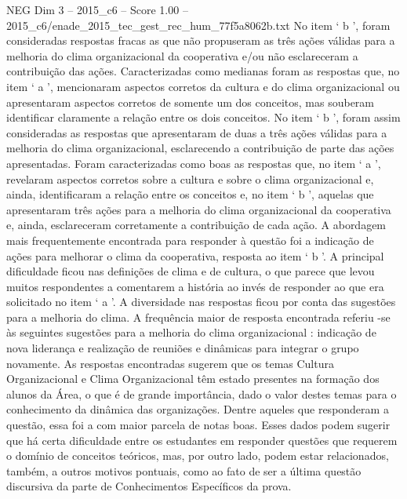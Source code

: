\begin{textsample}{NEG Dim 3 – 2015\_c6 – Score 1.00 – 2015\_c6/enade\_2015\_tec\_gest\_rec\_hum\_77f5a8062b.txt}
No item ‘ b ’, foram consideradas respostas fracas as que não propuseram as três ações válidas para a melhoria do clima organizacional da cooperativa e/ou não esclareceram a contribuição das ações.
Caracterizadas como medianas foram as respostas que, no item ‘ a ’, mencionaram aspectos corretos da cultura e do clima organizacional ou apresentaram aspectos corretos de somente um dos conceitos, mas souberam identificar claramente a relação entre os dois conceitos.
No item ‘ b ’, foram assim consideradas as respostas que apresentaram de duas a três ações válidas para a melhoria do clima organizacional, esclarecendo a contribuição de parte das ações apresentadas.
Foram caracterizadas como boas as respostas que, no item ‘ a ’, revelaram aspectos corretos sobre a cultura e sobre o clima organizacional e, ainda, identificaram a relação entre os conceitos e, no item ‘ b ’, aquelas que apresentaram três ações para a melhoria do clima organizacional da cooperativa e, ainda, esclareceram corretamente a contribuição de cada ação.
A abordagem mais frequentemente encontrada para responder à questão foi a indicação de ações para melhorar o clima da cooperativa, resposta ao item ‘ b ’.
A principal dificuldade ficou nas definições de clima e de cultura, o que parece que levou muitos respondentes a comentarem a história ao invés de responder ao que era solicitado no item ‘ a ’.
A diversidade nas respostas ficou por conta das sugestões para a melhoria do clima.
A frequência maior de resposta encontrada referiu -se às seguintes sugestões para a melhoria do clima organizacional : indicação de nova liderança e realização de reuniões e dinâmicas para integrar o grupo novamente.
As respostas encontradas sugerem que os temas Cultura Organizacional e Clima Organizacional têm estado presentes na formação dos alunos da Área, o que é de grande importância, dado o valor destes temas para o conhecimento da dinâmica das organizações.
Dentre aqueles que responderam a questão, essa foi a com maior parcela de notas boas.
Esses dados podem sugerir que há certa dificuldade entre os estudantes em responder questões que requerem o domínio de conceitos teóricos, mas, por outro lado, podem estar relacionados, também, a outros motivos pontuais, como ao fato de ser a última questão discursiva da parte de Conhecimentos Específicos da prova.

\end{textsample}
